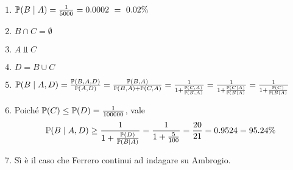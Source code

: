 \Soluzione
\Soluzione
\Soluzione
\Soluzione
\begin{enumerate}
\item $\mathbb{P}( B\mid A) =\frac{1}{5000} =0.0002\ =\ 0.02\%$
\item $B\cap C=\emptyset $
\item $A\Bot C$
\item $D=B\cup C$
\item $\mathbb{P}( B\mid A,D) =\frac{\mathbb{P}( B,A,D)}{\mathbb{P}( A,D)} =\frac{\mathbb{P}( B,A)}{\mathbb{P}( B,A) +\mathbb{P}( C,A)} =\frac{1}{1+\frac{\mathbb{P}( C,A)}{\mathbb{P}( B,A)}} =\frac{1}{1+\frac{\mathbb{P}( C\mid A)}{\mathbb{P}( B\mid A)}} =\frac{1}{1+\frac{\mathbb{P}( C)}{\mathbb{P}( B\mid A)}}$
\item Poiché $\mathbb{P}( C) \leq \mathbb{P}( D) =\frac{1}{100000}$, vale\begin{equation*}
\mathbb{P}( B\mid A,D) \geq \frac{1}{1+\frac{\mathbb{P}( D)}{\mathbb{P}( B\mid A)}} =\frac{1}{1+\frac{5}{100}} =\frac{20}{21} =0.9524=95.24\%
\end{equation*}
\item Sì è il caso che Ferrero continui ad indagare su Ambrogio.
\end{enumerate}
\Soluzione

